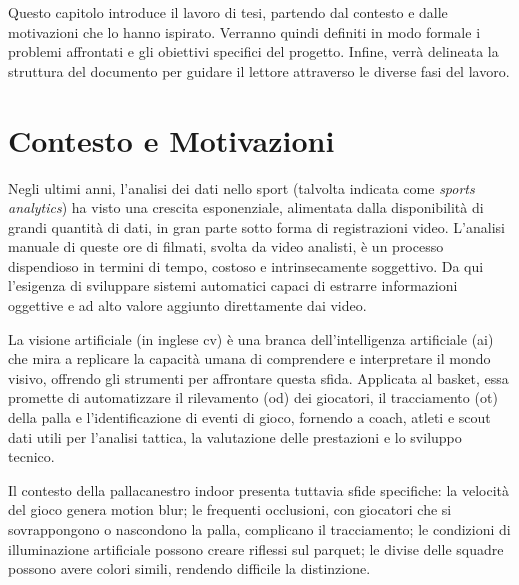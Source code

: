 \documentclass[12pt,a4paper,openright,twoside]{book}
\begin{document}
Questo capitolo introduce il lavoro di tesi, partendo dal contesto
e dalle motivazioni che lo hanno ispirato. Verranno quindi definiti
in modo formale i problemi affrontati e gli obiettivi specifici
del progetto. Infine, verrà delineata la struttura del documento
per guidare il lettore attraverso le diverse fasi del lavoro.


\section{Contesto e Motivazioni}
\label{sec:contesto-motivazioni}
Negli ultimi anni, l'analisi dei dati nello sport (talvolta indicata
come \emph{sports analytics}) ha visto una crescita esponenziale,
alimentata dalla disponibilità di grandi quantità di dati, 
in gran parte sotto forma di registrazioni video. L'analisi
manuale di queste ore di filmati, svolta da video analisti, è un
processo dispendioso in termini di tempo, costoso e
intrinsecamente soggettivo. Da qui l'esigenza di sviluppare
sistemi automatici capaci di estrarre informazioni oggettive e ad
alto valore aggiunto direttamente dai video.

La visione artificiale (in inglese \ac{cv}) è una branca
dell'intelligenza artificiale (\ac{ai}) che mira a replicare la capacità
umana di comprendere e interpretare il mondo visivo, offrendo gli
strumenti per affrontare questa sfida. Applicata al basket, essa
promette di automatizzare il rilevamento (\ac{od}) dei giocatori,
il tracciamento (\ac{ot}) della palla e l'identificazione di eventi di gioco,
fornendo a coach, atleti e scout dati utili per l'analisi
tattica, la valutazione delle prestazioni e lo sviluppo tecnico.

Il contesto della pallacanestro indoor presenta tuttavia sfide
specifiche: la velocità del gioco genera motion blur; le frequenti
occlusioni, con giocatori che si sovrappongono o nascondono la palla,
complicano il tracciamento; le condizioni di illuminazione artificiale
possono creare riflessi sul parquet; le divise delle squadre possono
avere colori simili, rendendo difficile la distinzione.
\end{document}
